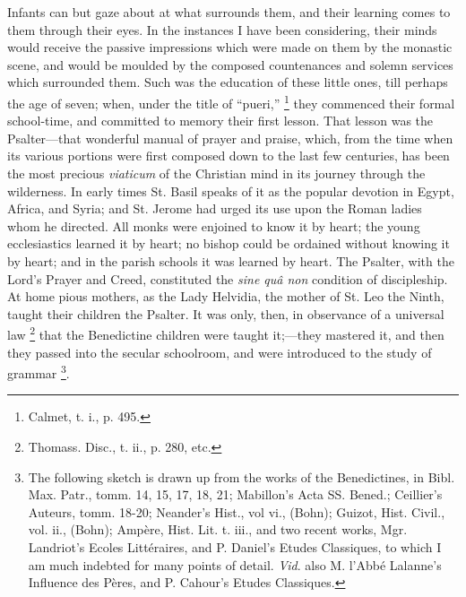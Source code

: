 Infants can but gaze about at what surrounds them, and their
learning comes to them through their eyes. In the instances I have
been considering, their minds would receive the passive impressions
which were made on them by the monastic scene, and would be moulded by
the composed countenances and solemn services which surrounded them.
Such was the education of these little ones, till perhaps the age of
seven; when, under the title of ``pueri,'' \footnote{Calmet, t. i.,
p. 495.} they commenced their formal school-time, and committed to
memory their first lesson. That lesson was the Psalter—that
wonderful manual of prayer and praise, which, from the time when its
various portions were first composed down to the last few centuries,
has been the most precious \emph{viaticum} of the Christian mind in
its journey through the wilderness. In early times St. Basil speaks of
it as the popular devotion in Egypt, Africa, and Syria; and St. Jerome
had urged its use upon the Roman ladies whom he directed. All monks
were enjoined to know it by heart; the young ecclesiastics learned it
by heart; no bishop could be ordained without knowing it by heart; and
in the parish schools it was learned by heart. The Psalter, with the
Lord's Prayer and Creed, constituted the \emph{sine quâ non}
condition of discipleship. At home pious mothers, as the Lady Helvidia,
the mother of St. Leo the Ninth, taught their children the Psalter. It
was only, then, in observance of a universal law \footnote{Thomass.
Disc., t. ii., p. 280, etc.} that the Benedictine children were taught it;—they mastered
it, and then they passed into the secular schoolroom, and were
introduced to the study of grammar \footnote{The following
sketch is drawn up from the works of the Benedictines, in Bibl. Max.
Patr., tomm. 14, 15, 17, 18, 21; Mabillon's Acta SS. Bened.; Ceillier's
Auteurs, tomm. 18-20; Neander's Hist., vol vi., (Bohn); Guizot, Hist.
Civil., vol. ii., (Bohn); Ampère, Hist. Lit. t. iii., and two recent
works, Mgr. Landriot's Ecoles Littéraires, and P. Daniel's Etudes
Classiques, to which I am much indebted for many points of detail. \emph{Vid}.
also M. l'Abbé Lalanne's Influence des Pères, and P. Cahour's Etudes
Classiques.}.

